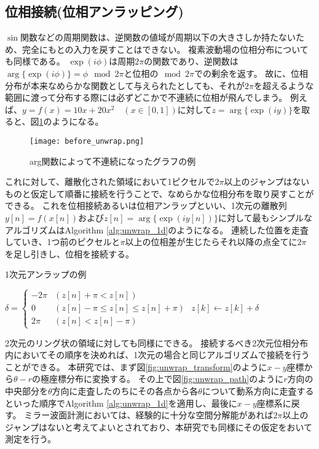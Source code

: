 \subsection{位相接続(位相アンラッピング)}
$\sin$関数などの周期関数は、逆関数の値域が周期以下の大きさしか持たないため、完全にもとの入力を戻すことはできない。
複素波動場の位相分布についても同様である。
$\exp(i\phi)$は周期$2\pi$の関数であり、逆関数は$\arg\{\exp(i\phi)\}=\phi \mod{2\pi}$と位相の$\mod{2\pi}$での剰余を返す。
故に、位相分布が本来なめらかな関数として与えられたとしても、それが$2\pi$を超えるような範囲に渡って分布する際には必ずどこかで不連続に位相が飛んでしまう。
例えば、$y = f(x) = 10x + 20x^2 \quad (x \in [0, 1])$に対して$z = \arg\{\exp(iy)\}$を取ると、図\ref{fig:wrapped_graph_example}のようになる。

\begin{figure}[ht]
\centering
\texttt{[image: before\_unwrap.png]}
\caption{arg関数によって不連続になったグラフの例}
\label{fig:wrapped_graph_example}
\end{figure}

これに対して、離散化された領域において1ピクセルで$2\pi$以上のジャンプはないものと仮定して順番に接続を行うことで、なめらかな位相分布を取り戻すことができる。
これを位相接続あるいは位相アンラップといい、1次元の離散列$y[n] = f(x[n])$および$z[n]=\arg\{\exp(iy[n])\}$に対して最もシンプルなアルゴリズムはAlgorithm \ref{alg:unwrap_1d}のようになる。
連続した位置を走査していき、1つ前のピクセルと$\pi$以上の位相差が生じたらそれ以降の点全てに$2\pi$を足し引きし、位相を接続する。

\begin{algorithm}                      
\caption{1次元アンラップの例}         
\label{alg:unwrap_1d}                          
\begin{algorithmic}
        \STATE $\delta = \begin{cases}
                -2 \pi & (z[n] + \pi < z[n]) \\
                0 & (z[n] - \pi \leq z[n] \leq z[n] + \pi) \\
                2 \pi & (z[n] < z[n] - \pi)
            \end{cases}$
            \STATE $z[k] \leftarrow z[k] + \delta$
        \ENDFOR
    \ENDFOR
\end{algorithmic}
\end{algorithm}

2次元のリング状の領域に対しても同様にできる。
接続するべき2次元位相分布内においてその順序を決めれば、1次元の場合と同じアルゴリズムで接続を行うことができる。
本研究では、まず図\ref{fig:unwrap_transform}のように$x-y$座標から$\theta-r$の極座標分布に変換する。
その上で図\ref{fig:unwrap_path}のように$r$方向の中央部分を$\theta$方向に走査したのちにその各点から各$\theta$について動系方向に走査するといった順序でAlgorithm \ref{alg:unwrap_1d}を適用し、最後に$x-y$座標系に戻す。
ミラー波面計測においては、経験的に十分な空間分解能があれば$2\pi$以上のジャンプはないと考えてよいとされており、本研究でも同様にその仮定をおいて測定を行う。

